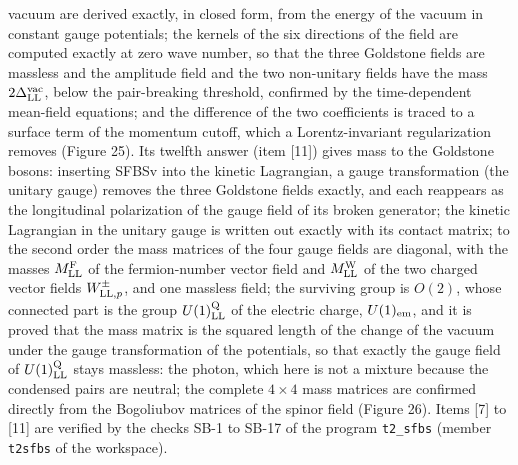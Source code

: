 \documentclass[
  10pt,
]{article}
\begin{document}
vacuum are derived exactly, in closed form, from the energy of the
vacuum in constant gauge potentials; the kernels of the six directions
of the field are computed exactly at zero wave number, so that the three
Goldstone fields are massless and the amplitude field and the two
non-unitary fields have the mass \(2\Delta^{\rm vac}_{\rm LL}\), below
the pair-breaking threshold, confirmed by the time-dependent mean-field
equations; and the difference of the two coefficients is traced to a
surface term of the momentum cutoff, which a Lorentz-invariant
regularization removes (Figure 25). Its twelfth answer (item {[}11{]})
gives mass to the Goldstone bosons: inserting SFBSv into the kinetic
Lagrangian, a gauge transformation (the unitary gauge) removes the three
Goldstone fields exactly, and each reappears as the longitudinal
polarization of the gauge field of its broken generator; the kinetic
Lagrangian in the unitary gauge is written out exactly with its contact
matrix; to the second order the mass matrices of the four gauge fields
are diagonal, with the masses \(M^{\rm F}_{\rm LL}\) of the
fermion-number vector field and \(M^{\rm W}_{\rm LL}\) of the two
charged vector fields \(W^\pm_{{\rm LL},p}\), and one massless field;
the surviving group is \(O(2)\), whose connected part is the group
\(U(1)^{\rm Q}_{\rm LL}\) of the electric charge, \(U(1)_{\rm em}\), and
it is proved that the mass matrix is the squared length of the change of
the vacuum under the gauge transformation of the potentials, so that
exactly the gauge field of \(U(1)^{\rm Q}_{\rm LL}\) stays massless: the
photon, which here is not a mixture because the condensed pairs are
neutral; the complete \(4\times4\) mass matrices are confirmed directly
from the Bogoliubov matrices of the spinor field (Figure 26). Items
{[}7{]} to {[}11{]} are verified by the checks SB-1 to SB-17 of the
program \texttt{t2\_sfbs} (member \texttt{t2sfbs} of the workspace).
\end{document}
